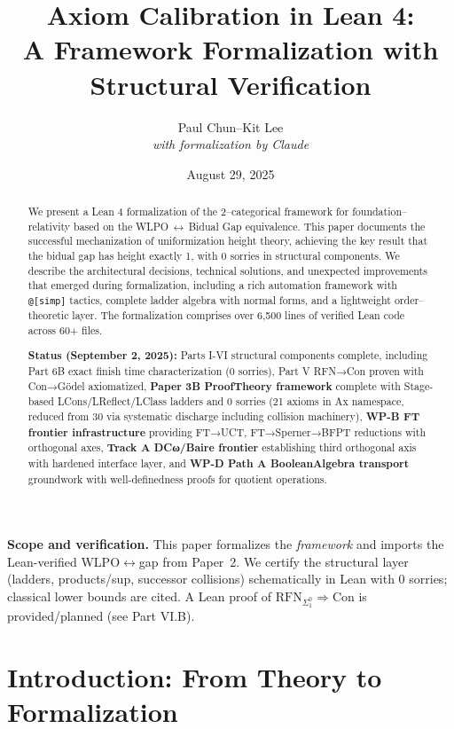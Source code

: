 \documentclass[11pt]{article}
\title{Axiom Calibration in Lean 4:\\
A Framework Formalization with Structural Verification}
\author{Paul Chun--Kit Lee\\
\textit{with formalization by Claude}}
\date{August 29, 2025}
\theoremstyle{definition}
\theoremstyle{remark}
\begin{document}
\maketitle

\begin{abstract}
We present a Lean 4 formalization of the 2--categorical framework for foundation--relativity based on the WLPO\,$\leftrightarrow$\,Bidual Gap equivalence. This paper documents the successful mechanization of uniformization height theory, achieving the key result that the bidual gap has height exactly 1, with 0 sorries in structural components. We describe the architectural decisions, technical solutions, and unexpected improvements that emerged during formalization, including a rich automation framework with \texttt{@[simp]} tactics, complete ladder algebra with normal forms, and a lightweight order--theoretic layer. The formalization comprises over 6,500 lines of verified Lean code across 60+ files. 

\textbf{Status (September 2, 2025):} Parts I-VI structural components complete, including Part 6B exact finish time characterization (0 sorries), Part V RFN→Con proven with Con→Gödel axiomatized, \textbf{Paper 3B ProofTheory framework} complete with Stage-based LCons/LReflect/LClass ladders and 0 sorries (21 axioms in Ax namespace, reduced from 30 via systematic discharge including collision machinery), \textbf{WP-B FT frontier infrastructure} providing FT→UCT, FT→Sperner→BFPT reductions with orthogonal axes, \textbf{Track A DCω/Baire frontier} establishing third orthogonal axis with hardened interface layer, and \textbf{WP-D Path A BooleanAlgebra transport} groundwork with well-definedness proofs for quotient operations.
\end{abstract}

\begin{mdframed}[style=status]
\textbf{Scope and verification.} 
This paper formalizes the \emph{framework} and imports the Lean-verified WLPO$\leftrightarrow$gap from Paper~2. 
We certify the structural layer (ladders, products/sup, successor collisions) schematically in Lean with 0 sorries; 
classical lower bounds are cited. A Lean proof of $\mathrm{RFN}_{\Sigma^0_1}\Rightarrow\mathrm{Con}$ is provided/planned (see Part VI.B).
\end{mdframed}

\tableofcontents

\section{Introduction: From Theory to Formalization}
\end{document}
